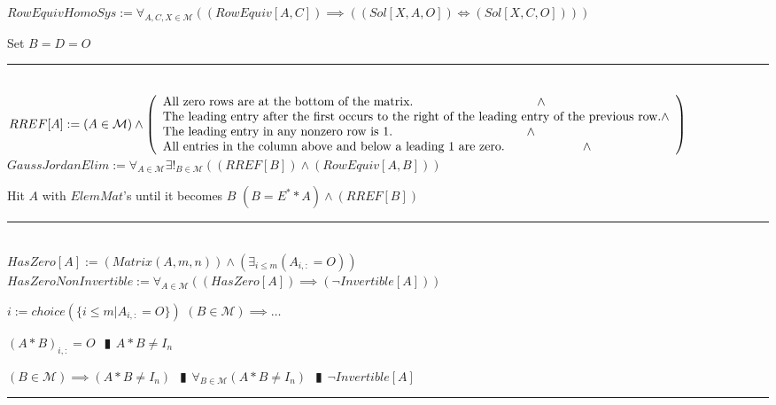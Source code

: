 \documentclass{book}
\newcommand{\abr}{:=}
\newcommand{\pipe}{$\phantom{(}\vrectangleblack\phantom{)}$}
\newcommand{\pr}[1]{\left(#1\right)}
\begin{document}
$RowEquivHomoSys \abr \forall_{A, C, X \in \mathcal{M}}\pr{(RowEquiv[A, C]) \implies \pr{(Sol[X, A, O]) \iff (Sol[X, C, O])}}$
\begin{enumerate}
  \lit Set $B = D = O$
\end{enumerate} \vspace{.75mm} \hrule \vspace{.75mm} \ \\ 

$RREF[A] \abr (A \in \mathcal{M}) \land \left(\begin{array}{ll}
  \text{All zero rows are at the bottom of the matrix.} \hfill \land \hfill \\
  \text{The leading entry after the first occurs to the right of the leading entry of the previous row.} \hfill \land \hfill \\
  \text{The leading entry in any nonzero row is 1.} \hfill \land \hfill \\
  \text{All entries in the column above and below a leading 1 are zero.} \hfill \land \hfill \\
\end{array}\right)$ \\

$GaussJordanElim \abr \forall_{A \in \mathcal{M}} \exists!_{B \in \mathcal{M}}\pr{(RREF[B]) \land (RowEquiv[A, B])}$
\begin{enumerate}
  \lit Hit $A$ with $ElemMat$'s until it becomes $B$
  \lit $(B = E^* * A) \land (RREF[B])$
\end{enumerate} \vspace{.75mm} \hrule \vspace{.75mm} \ \\ 

$HasZero[A] \abr \pr{Matrix(A, m, n)} \land \pr{\exists_{i \leq m}(A_{i, :} = O)}$ \\

$HasZeroNonInvertible \abr \forall_{A \in \mathcal{M}}\pr{(HasZero[A]) \implies (\lnot Invertible[A])}$
\begin{enumerate}
  \lit $i \abr choice(\{i \leq m | A_{i, :} = O\})$
  \lit $(B \in \mathcal{M}) \implies \ldots$
  \begin{enumerate}
    \lit $(A * B)_{i, :} = O$ \pipe $A * B \neq I_n$
  \end{enumerate}
  \lit $(B \in \mathcal{M}) \implies (A * B \neq I_n)$ \pipe $\forall_{B \in \mathcal{M}}(A * B \neq I_n)$ \pipe $\lnot Invertible[A]$
\end{enumerate} \vspace{.75mm} \hrule \vspace{.75mm} \ \\ 
\end{document}

